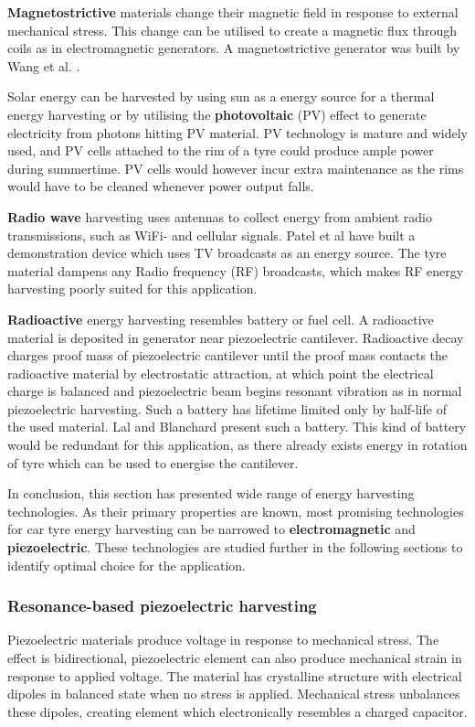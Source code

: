 \textbf{Magnetostrictive} materials change their magnetic field in response to external mechanical stress. This change can be utilised to create a magnetic flux through coils as in electromagnetic generators. A magnetostrictive generator was built by Wang et al. \cite{Wang2006}. 

Solar energy can be harvested by using sun as a energy source for a thermal energy harvesting or by utilising the \textbf{photovoltaic} (PV) effect to generate electricity from photons hitting PV material. PV technology is mature and widely used, and PV cells attached to the rim of a tyre could produce ample power during summertime. PV cells would however incur extra maintenance as the rims would have to be cleaned whenever power output falls. 

\textbf{Radio wave} harvesting uses antennas to collect energy from ambient radio transmissions, such as WiFi- and cellular signals. Patel et al \cite{Patel2014} have built a demonstration device which uses TV broadcasts as an energy source. The tyre material dampens any Radio frequency (RF) broadcasts, which makes RF energy harvesting poorly suited for this application.

\textbf{Radioactive} energy harvesting resembles battery or fuel cell. A radioactive material is deposited in generator near piezoelectric cantilever. Radioactive decay charges proof mass of piezoelectric cantilever until the proof mass contacts the radioactive material by electrostatic attraction, at which point the electrical charge is balanced and piezoelectric beam begins resonant vibration as in normal piezoelectric harvesting. Such a battery has lifetime limited only by half-life of the used material. Lal and Blanchard \cite{Lal2004} present such a battery. This kind of battery would be redundant for this application, as there already exists energy in rotation of tyre which can be used to energise the cantilever. 

In conclusion, this section has presented wide range of energy harvesting technologies. As their primary properties are known, most promising technologies for car tyre energy harvesting can be narrowed to \textbf{electromagnetic} and \textbf{piezoelectric}. These technologies are studied further in the following sections to identify optimal choice for the application.

\subsubsection{Resonance-based piezoelectric harvesting}
Piezoelectric materials produce voltage in response to mechanical stress. The effect is bidirectional, piezoelectric element can also produce mechanical strain in response to applied voltage. The material has crystalline structure with electrical dipoles in balanced state when no stress is applied. Mechanical stress unbalances these dipoles, creating element which electronically resembles a charged capacitor. 

